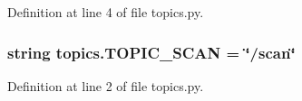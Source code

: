 Definition at line 4 of file topics.\+py.

\subsubsection[{\texorpdfstring{T\+O\+P\+I\+C\+\_\+\+S\+C\+AN}{TOPIC_SCAN}}]{\setlength{\rightskip}{0pt plus 5cm}string topics.\+T\+O\+P\+I\+C\+\_\+\+S\+C\+AN = \char`\"{}/scan\char`\"{}}\hypertarget{namespacetopics_ac80f7b07b167f46456612250e91dda20}{}\label{namespacetopics_ac80f7b07b167f46456612250e91dda20}


Definition at line 2 of file topics.\+py.

